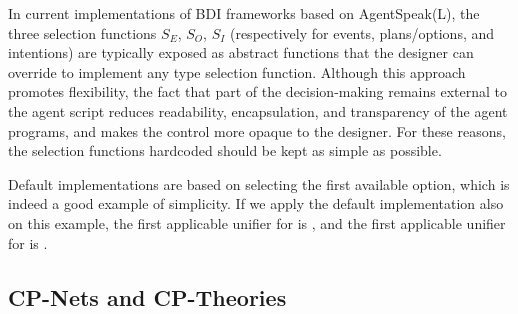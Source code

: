 In current implementations of BDI frameworks based on AgentSpeak(L), the three selection functions $S_E$, $S_O$, $S_I$ (respectively for events, plans/options, and intentions) are typically exposed as abstract functions that the designer can override to implement any type selection function. Although this approach promotes flexibility, the fact that part of the decision-making remains external to the agent script reduces readability, encapsulation, and transparency of the agent programs, and makes the control more opaque to the designer. For these reasons, the selection functions hardcoded should be kept as simple as possible.

Default implementations are based on selecting the first available option, which is indeed a good example of simplicity.
If we apply the default implementation also on this example, the first applicable unifier for  is , and the first applicable unifier for  is .  %


\subsection{CP-Nets and CP-Theories}
\label{ssec:prefs}


